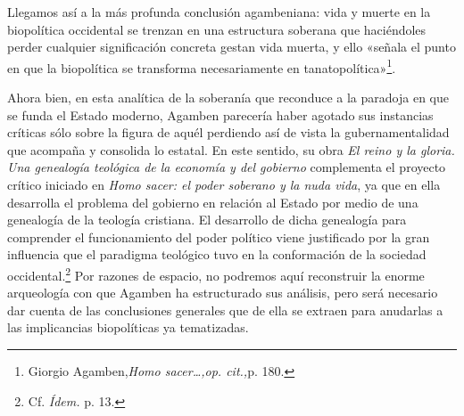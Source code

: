 Llegamos así a la más profunda conclusión agambeniana: vida y muerte en la biopolítica occidental se trenzan en una estructura soberana que haciéndoles perder cualquier significación concreta gestan vida muerta, y ello «señala el punto en que la biopolítica se transforma necesariamente en tanatopolítica»\footnote{Giorgio Agamben,\emph{Homo sacer\ldots,op. cit.,}p. 180.}.

Ahora bien, en esta analítica de la soberanía que reconduce a la paradoja en que se funda el Estado moderno, Agamben parecería haber agotado sus instancias críticas sólo sobre la figura de aquél perdiendo así de vista la gubernamentalidad que acompaña y consolida lo estatal. En este sentido, su obra \emph{El reino y la gloria. Una genealogía teológica de la economía y del gobierno} complementa el proyecto crítico iniciado en \emph{Homo sacer: el poder soberano y la nuda vida}, ya que en ella desarrolla el problema del gobierno en relación al Estado por medio de una genealogía de la teología cristiana. El desarrollo de dicha genealogía para comprender el funcionamiento del poder político viene justificado por la gran influencia que el paradigma teológico tuvo en la conformación de la sociedad occidental.\footnote{Cf. \emph{Ídem.} p. 13.} Por razones de espacio, no podremos aquí reconstruir la enorme arqueología con que Agamben ha estructurado sus análisis, pero será necesario dar cuenta de las conclusiones generales que de ella se extraen para anudarlas a las implicancias biopolíticas ya tematizadas.

